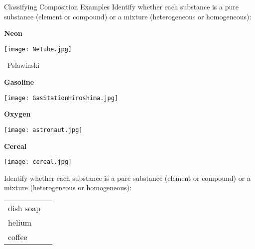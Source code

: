 \documentclass[notes=only]{beamer}
\begin{document}
\begin{frame}[t]{Classifying Composition Examples}
	Identify whether each substance is a \alert{pure substance} (element or
	compound) or a \alert{mixture} (heterogeneous or homogeneous):
	
	\begin{center}
		\begin{minipage}[t]{0.3\linewidth}
			\centering
			\textbf{Neon} 

			\medskip

			\texttt{[image: NeTube.jpg]}

			\medskip
			
			\tiny{\ccbysa\ Pslawinski}
		\end{minipage}
		\qquad
		\begin{minipage}[t]{0.3\linewidth}
			\centering
			\textbf{Gasoline}

			\medskip

			\texttt{[image: GasStationHiroshima.jpg]}
		\end{minipage}

		\bigskip

		\begin{minipage}[t]{0.3\linewidth}
			\centering
			\textbf{Oxygen}

			\medskip

			\texttt{[image: astronaut.jpg]}
		\end{minipage}
		\qquad
		\begin{minipage}[t]{0.3\linewidth}
			\centering
			\textbf{Cereal}

			\medskip

			\texttt{[image: cereal.jpg]}
		\end{minipage}
	\end{center}
	
\end{frame}

\begin{onyourown}%
	Identify whether each substance is a \alert{pure substance} (element or
	compound) or a \alert{mixture} (heterogeneous or homogeneous):
	
	\renewcommand\arraystretch{2}
	\begin{tabularx}{\linewidth} {l@{\qquad}X}
		dish soap & \\ \cline{2-2}
		helium & \\ \cline{2-2}
		coffee & \\ \cline{2-2}
	\end{tabularx}
\end{onyourown}
\end{document}
